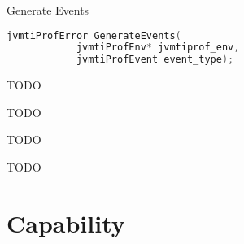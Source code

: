 \begin{apidef}{Generate Events}
\begin{lstlisting}[language=C]
jvmtiProfError GenerateEvents(
            jvmtiProfEnv* jvmtiprof_env,
            jvmtiProfEvent event_type);
\end{lstlisting}

\begin{apidesc}
TODO
\end{apidesc}

\begin{apiphase}
TODO
\end{apiphase}

\begin{apicap}
TODO
\end{apicap}

\begin{apiparam}
\end{apiparam}

\begin{apireturn}
TODO
\end{apireturn}

\begin{apierror}
\end{apierror}
\end{apidef}

\section{Capability}

